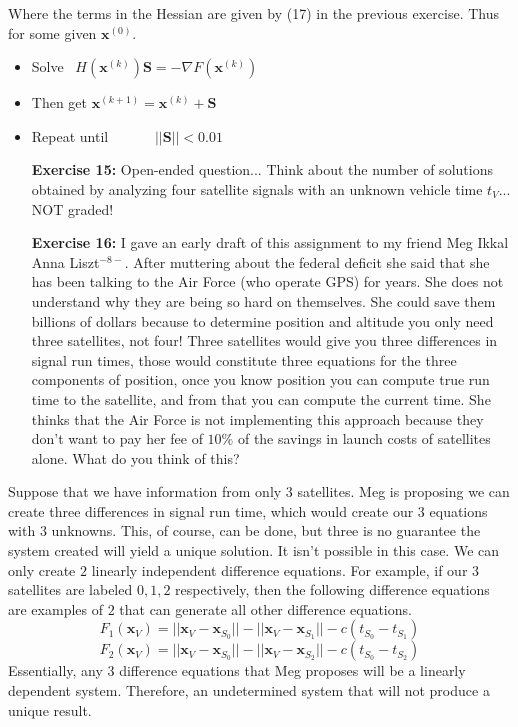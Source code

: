 \documentclass[11pt]{article}
\theoremstyle{definition}
\newcommand{\1}[1]{\mathbf{1} \left \{ #1 \right \}}
\begin{document}
Where the terms in the Hessian are given by (17) in the previous exercise.  Thus for some given $\textbf{x}^{(0)}$.
\begin{itemize}
    \item Solve \ \qquad \(H(\textbf{x}^{(k)})\textbf{S} = -\nabla F(\textbf{x}^{(k)})\)
    \item Then get \qquad \quad  \(\textbf{x}^{(k+1)} = \textbf{x}^{(k)} + \textbf{S}\)
    \item Repeat until \(\qquad \quad ||\textbf{S}|| < 0.01\)
\end{itemize}

\begin{itemize}
\item[{\textbf{Exercise 15:}}] Open-ended question... Think about the number of solutions obtained by analyzing four satellite signals with an unknown vehicle time $t_V$... NOT graded!
\end{itemize}

\begin{itemize}
\item[{\textbf{Exercise 16:}}] I gave an early draft of this assignment to my friend Meg Ikkal Anna Liszt$^{-8-}$.  After muttering about the federal deficit she said that she has been talking to the Air Force (who operate GPS) for years.  She does not understand why they are being so hard on themselves.  She could save them billions of dollars because to determine position and altitude you only need three satellites, not four!  Three satellites would give you three differences in signal run times, those would constitute three equations for the three components of position, once you know position you can compute true run time to the satellite, and from that you can compute the current time.  She thinks that the Air Force is not implementing this approach because they don't want to pay her fee of $10\%$ of the savings in launch costs of satellites alone.  What do you think of this?
\end{itemize}
Suppose that we have information from only $3$ satellites.  Meg is proposing we can create three differences in signal run time, which would create our $3$ equations with $3$ unknowns. This, of course, can be done, but three is no guarantee the system created will yield a unique solution. It isn't possible in this case.  We can only create $2$ linearly independent difference equations.  For example, if our $3$ satellites are labeled $0,1,2$ respectively, then the following difference equations are examples of $2$ that can generate all other difference equations.
\[F_1 (\textbf{x}_V) = ||\textbf{x}_V - \textbf{x}_{S_0}|| - ||\textbf{x}_V - \textbf{x}_{S_1}|| - c(t_{S_0} - t_{S_1})\]
\[F_2 (\textbf{x}_V) = ||\textbf{x}_V - \textbf{x}_{S_0}|| - ||\textbf{x}_V - \textbf{x}_{S_2}|| - c(t_{S_0} - t_{S_2})\]
Essentially, any $3$ difference equations that Meg proposes will be a linearly dependent system.  Therefore, an undetermined system that will not produce a unique result.
\end{document}
